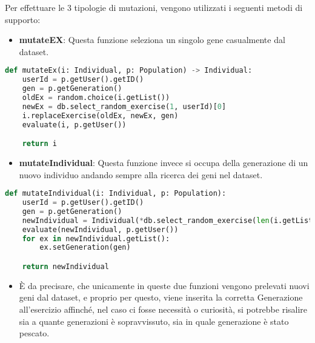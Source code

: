 \documentclass{article}
\begin{document}
\pagebreak

Per effettuare le 3 tipologie di mutazioni, vengono utilizzati i seguenti metodi di supporto:

\begin{itemize}
\item\textbf{mutateEX}: Questa funzione seleziona un singolo gene casualmente dal dataset.
\end{itemize}

\begin{lstlisting}[language=Python, breaklines, no caption]
def mutateEx(i: Individual, p: Population) -> Individual:
    userId = p.getUser().getID()
    gen = p.getGeneration()
    oldEx = random.choice(i.getList())
    newEx = db.select_random_exercise(1, userId)[0]
    i.replaceExercise(oldEx, newEx, gen)
    evaluate(i, p.getUser())

    return i
\end{lstlisting}

\begin{itemize}
\item\textbf{mutateIndividual}: Questa funzione invece si occupa della generazione di un nuovo individuo andando sempre alla ricerca dei geni nel dataset.
\end{itemize}

\begin{lstlisting}[language=Python, breaklines, no caption]
def mutateIndividual(i: Individual, p: Population):
    userId = p.getUser().getID()
    gen = p.getGeneration()
    newIndividual = Individual(*db.select_random_exercise(len(i.getList()), userId))
    evaluate(newIndividual, p.getUser())
    for ex in newIndividual.getList():
        ex.setGeneration(gen)

    return newIndividual
\end{lstlisting}
\begin{itemize}
\begin{itemize}
    \item È da precisare, che unicamente in queste due funzioni vengono prelevati nuovi geni dal dataset, e proprio per questo, viene inserita la corretta Generazione all'esercizio affinché, nel caso ci fosse necessità o curiosità, si potrebbe risalire sia a quante generazioni è sopravvissuto, sia in quale generazione è stato pescato.
\end{itemize}
\end{itemize}
\pagebreak
\end{document}
